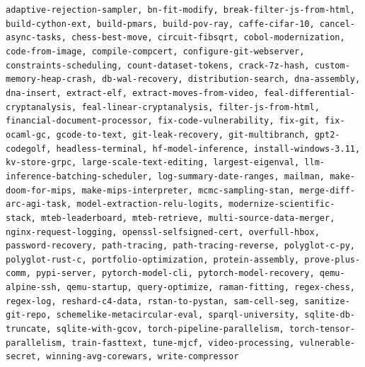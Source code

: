 \documentclass{article}
\begin{document}
{\scriptsize\texttt{adaptive-rejection-sampler, bn-fit-modify, break-filter-js-from-html, build-cython-ext, build-pmars, build-pov-ray, caffe-cifar-10, cancel-async-tasks, chess-best-move, circuit-fibsqrt, cobol-modernization, code-from-image, compile-compcert, configure-git-webserver, constraints-scheduling, count-dataset-tokens, crack-7z-hash, custom-memory-heap-crash, db-wal-recovery, distribution-search, dna-assembly, dna-insert, extract-elf, extract-moves-from-video, feal-differential-cryptanalysis, feal-linear-cryptanalysis, filter-js-from-html, financial-document-processor, fix-code-vulnerability, fix-git, fix-ocaml-gc, gcode-to-text, git-leak-recovery, git-multibranch, gpt2-codegolf, headless-terminal, hf-model-inference, install-windows-3.11, kv-store-grpc, large-scale-text-editing, largest-eigenval, llm-inference-batching-scheduler, log-summary-date-ranges, mailman, make-doom-for-mips, make-mips-interpreter, mcmc-sampling-stan, merge-diff-arc-agi-task, model-extraction-relu-logits, modernize-scientific-stack, mteb-leaderboard, mteb-retrieve, multi-source-data-merger, nginx-request-logging, openssl-selfsigned-cert, overfull-hbox, password-recovery, path-tracing, path-tracing-reverse, polyglot-c-py, polyglot-rust-c, portfolio-optimization, protein-assembly, prove-plus-comm, pypi-server, pytorch-model-cli, pytorch-model-recovery, qemu-alpine-ssh, qemu-startup, query-optimize, raman-fitting, regex-chess, regex-log, reshard-c4-data, rstan-to-pystan, sam-cell-seg, sanitize-git-repo, schemelike-metacircular-eval, sparql-university, sqlite-db-truncate, sqlite-with-gcov, torch-pipeline-parallelism, torch-tensor-parallelism, train-fasttext, tune-mjcf, video-processing, vulnerable-secret, winning-avg-corewars, write-compressor}}
\end{document}
